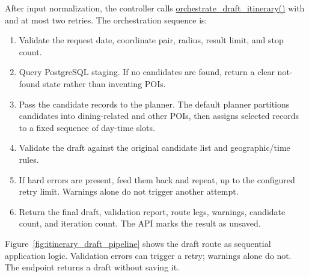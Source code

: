 After input normalization, the controller calls \url{orchestrate_draft_itinerary()} with  and at most two retries. The orchestration sequence is:
\begin{enumerate}[leftmargin=1.8em,itemsep=3pt]
    \item Validate the request date, coordinate pair, radius, result limit, and stop count.
    \item Query PostgreSQL staging. If no candidates are found, return a clear not-found state rather than inventing POIs.
    \item Pass the candidate records to the planner. The default planner partitions candidates into dining-related and other POIs, then assigns selected records to a fixed sequence of day-time slots.
    \item Validate the draft against the original candidate list and geographic/time rules.
    \item If hard errors are present, feed them back and repeat, up to the configured retry limit. Warnings alone do not trigger another attempt.
    \item Return the final draft, validation report, route legs, warnings, candidate count, and iteration count. The API marks the result as unsaved.
\end{enumerate}

Figure~\ref{fig:itinerary_draft_pipeline} shows the draft route as sequential application logic. Validation errors can trigger a retry; warnings alone do not. The endpoint returns a draft without saving it.


